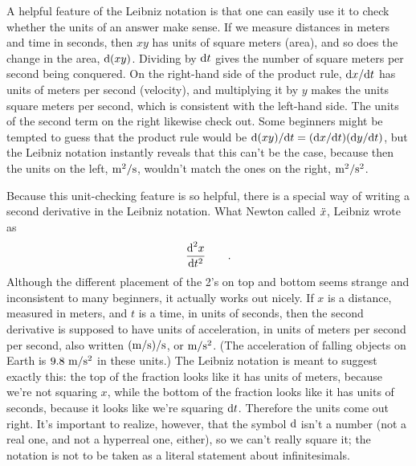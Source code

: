 A helpful feature of the Leibniz notation is that one can easily use it to check whether the units of an
answer make sense. If we measure distances in meters and time in seconds, then $xy$ has units of
square meters (area), and so does the change in the area, $\textup{d}(xy)$. Dividing by $\textup{d} t$ gives the
number of square meters per second being conquered. On the right-hand side of the product rule,
$\textup{d} x/\textup{d} t$ has units of meters per second (velocity), and multiplying it by
$y$ makes the units square meters per second, which is consistent with the left-hand side. The
units of the second term on the right likewise check out. Some beginners might be tempted to
guess that the product rule would be $\textup{d}(xy)/\textup{d} t=(\textup{d} x/\textup{d} t)(\textup{d} y/\textup{d} t)$, but the Leibniz
notation instantly reveals that this can't be the case, because then the units on the left,
$\textup{m}^2/\textup{s}$, wouldn't match the ones on the right, $\textup{m}^2/\textup{s}^2$.

Because this unit-checking feature is so helpful, there is a special way of writing a second
derivative in the Leibniz notation. What Newton called $\Ddot{x}$, Leibniz wrote as
\begin{equation*}
  \frac{\textup{d}^2 x}{\textup{d} t^2} \qquad .
\end{equation*}
Although the different placement of the 2's on top and bottom seems strange and inconsistent to many
beginners, it actually works out nicely.
If $x$ is a distance, measured in meters, and $t$ is a time, in units of seconds, then the
second derivative is supposed to have units of acceleration, in units of meters per second per
second, also written $(\textup{m}/\textup{s})/\textup{s}$, or $\textup{m}/\textup{s}^2$. (The acceleration of falling
objects on Earth is $9.8\ \munit/\sunit^2$ in these units.) The Leibniz notation is meant to suggest
exactly this: the top of the fraction looks like it has units of meters, because we're not squaring $x$,
while the bottom of the fraction looks like it has units of seconds, because it looks like we're
squaring $\textup{d} t$. Therefore the units come out right. It's important to realize, however, that
the symbol $\textup{d}$ isn't a number (not a real one, and not a hyperreal one, either), so we can't really
square it; the notation is not to be taken as a literal statement about infinitesimals.

